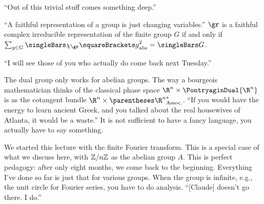 \documentclass[10pt, a4paper, twoside]{lecturenotes}
\newcommand{\Rn}{{\R^n}}
\begin{document}
\begin{lecture}[date=2013-03-14, official=true]
``Out of this trivial stuff comes something deep.''

``A faithful representation of a group is just changing variables.''
$\gr$ is a faithful complex irreducible representation of the finite group $G$ if and only if $\sum{g\in G} \abs{\Character[\gr]\of g}^2 = \Cardinality G$.

``I will see those of you who actually do come back next Tuesday.''
\end{lecture}
\begin{lecture}[date=2013-03-19, official=true]
The dual group only works for abelian groups. 
The way a bourgeois mathematician thinks of the classical phase space $\Rn\Cartesian\PontryaginDual\Rn$ is as the cotangent bundle $\Rn\Cartesian\Dual{\pa\Rn}$.
``If you would have the energy to learn ancient Greek, and you talked about the real housewives of Atlanta, it would be a waste.'' It is not sufficient to have a fancy language, you actually have to say something.

We started this lecture with the finite Fourier transform. This is a special case of what we discuss here, with $\mathbb{Z} /{n}\mathbb{Z}$ as the abelian group $A$. This is perfect pedagogy: after only eight months, we come back to the beginning. Everything I've done so far is just that for various groups. When the group is infinite, e.g., the unit circle for Fourier series, you have to do analysis. ``[Claude] doesn't go there. I do.''
\end{lecture}
\end{document}
